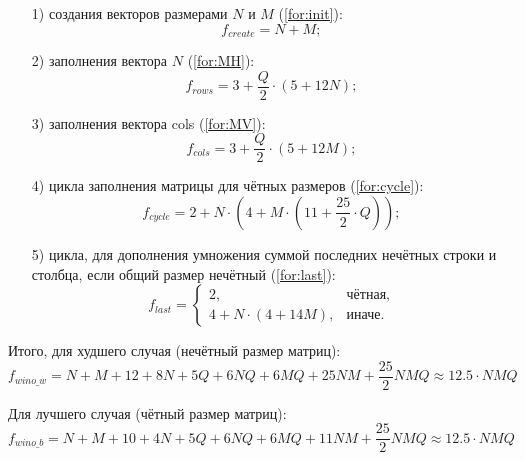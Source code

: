 \documentclass[12pt]{report}
\begin{document}
	\begin{enumerate}
		\item[1)] создания векторов размерами $N$ и $M$ (\ref{for:init}):
		\begin{equation}
		\label{for:init}
		f_{create} = N + M;
		\end{equation}
		
		\item[2)] заполнения вектора $N$ (\ref{for:MH}):
		\begin{equation}
		\label{for:MH}
		f_{rows} = 3 + \frac{Q}{2} \cdot (5 + 12N);
		\end{equation}
		
		\item[3)] заполнения вектора cols (\ref{for:MV}):
		\begin{equation}
		\label{for:MV}
		f_{cols} = 3 + \frac{Q}{2} \cdot (5 + 12M);
		\end{equation}
		
		\item[4)] цикла заполнения матрицы для чётных размеров (\ref{for:cycle}):
		\begin{equation}
		\label{for:cycle}
		f_{cycle} = 2 + N \cdot (4 + M \cdot (11 + \frac{25}{2} \cdot Q));
		\end{equation}
		
		\item[5)] цикла, для дополнения умножения суммой последних нечётных строки и столбца, если общий размер нечётный (\ref{for:last}):
		\begin{equation}
		\label{for:last}
		f_{last} = \begin{cases}
		2, & \text{чётная,}\\
		4 + N \cdot (4 + 14M), & \text{иначе.}
		\end{cases}
		\end{equation}
	\end{enumerate}

	Итого, для худшего случая (нечётный размер матриц): 
	\begin{equation}
	\label{for:bad}
	f_{wino\_w} = N + M + 12 + 8N + 5Q + 6NQ + 6MQ + 25NM + \frac{25}{2}NMQ \approx 12.5 \cdot NMQ
	\end{equation}

	Для лучшего случая (чётный размер матриц): 
	\begin{equation}
	\label{for:good}
	f_{wino\_b} = N + M + 10 + 4N + 5Q + 6NQ + 6MQ + 11NM + \frac{25}{2}NMQ \approx 12.5 \cdot NMQ
	\end{equation}
\end{document}
